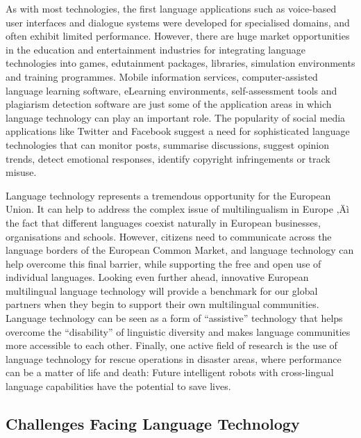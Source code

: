 \begin{multicols}{2}
As with most technologies, the first language applications such as voice-based user interfaces and dialogue systems were developed for specialised domains, and often exhibit limited performance. However, there are huge market opportunities in the education and entertainment industries for integrating language technologies into games, edutainment packages, libraries, simulation environments and training programmes. Mobile information services, computer-assisted language learning software, eLearning environments, self-assessment tools and plagiarism detection software are just some of the application areas in which language technology can play an important role. The popularity of social media applications like Twitter and Facebook suggest a need for sophisticated language technologies that can monitor posts, summarise discussions, suggest opinion trends, detect emotional responses, identify copyright infringements or track misuse.


Language technology represents a tremendous opportunity for the
European Union. It can help to address the complex issue of
multilingualism in Europe ‚Äì the fact that different languages coexist
naturally in European businesses, organisations and schools. However,
citizens need to communicate across the language borders of the
European Common Market, and language technology can help overcome this
final barrier, while supporting the free and open use of individual
languages. Looking even further ahead, innovative European
multilingual language technology will provide a benchmark for our
global partners when they begin to support their own multilingual
communities. Language technology can be seen as a form of “assistive”
technology that helps overcome the “disability” of linguistic
diversity and makes language communities more accessible to each
other. Finally, one active field of research is the use of language
technology for rescue operations in disaster areas, where performance
can be a matter of life and death: Future intelligent robots with
cross-lingual language capabilities have the potential to save lives.

\subsection{Challenges Facing Language Technology}


\end{multicols}
